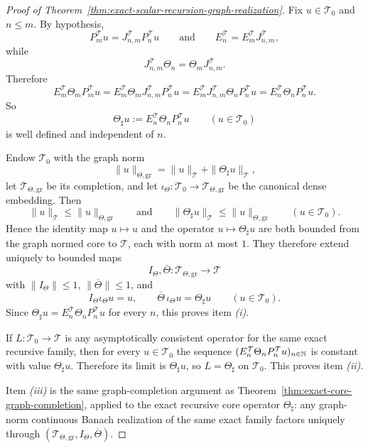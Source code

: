 \begin{proof}[Proof of Theorem~\ref{thm:exact-scalar-recursion-graph-realization}]
\label{proof:thm:exact-scalar-recursion-graph-realization}
Fix \(u\in\mathcal T_0\) and \(n\le m\). By hypothesis,
\[
P_m^{\mathcal T}u=J_{n,m}^{\mathcal T}P_n^{\mathcal T}u
\qquad\text{and}\qquad
E_n^{\mathcal T}=E_m^{\mathcal T}J_{n,m}^{\mathcal T},
\]
while
\[
J_{n,m}^{\mathcal T}\Theta_n=\Theta_mJ_{n,m}^{\mathcal T}.
\]
Therefore
\[
E_m^{\mathcal T}\Theta_mP_m^{\mathcal T}u
=
E_m^{\mathcal T}\Theta_mJ_{n,m}^{\mathcal T}P_n^{\mathcal T}u
=
E_m^{\mathcal T}J_{n,m}^{\mathcal T}\Theta_nP_n^{\mathcal T}u
=
E_n^{\mathcal T}\Theta_nP_n^{\mathcal T}u.
\]
So
\[
\Theta_\sharp u:=E_n^{\mathcal T}\Theta_nP_n^{\mathcal T}u
\qquad (u\in\mathcal T_0)
\]
is well defined and independent of \(n\).

Endow \(\mathcal T_0\) with the graph norm
\[
\|u\|_{\Theta,\mathrm{gr}}
=
\|u\|_{\mathcal T}+\|\Theta_\sharp u\|_{\mathcal T},
\]
let \(\mathcal T_{\Theta,\mathrm{gr}}\) be its completion, and let
\(\iota_\Theta:\mathcal T_0\to\mathcal T_{\Theta,\mathrm{gr}}\) be the
canonical dense embedding. Then
\[
\|u\|_{\mathcal T}\le \|u\|_{\Theta,\mathrm{gr}}
\qquad\text{and}\qquad
\|\Theta_\sharp u\|_{\mathcal T}\le \|u\|_{\Theta,\mathrm{gr}}
\qquad (u\in\mathcal T_0).
\]
Hence the identity map \(u\mapsto u\) and the operator
\(u\mapsto \Theta_\sharp u\) are both bounded from the graph normed core to
\(\mathcal T\), each with norm at most \(1\). They therefore extend uniquely
to bounded maps
\[
I_\Theta,\overline\Theta:\mathcal T_{\Theta,\mathrm{gr}}\to\mathcal T
\]
with \(\|I_\Theta\|\le 1\), \(\|\overline\Theta\|\le 1\), and
\[
I_\Theta\iota_\Theta u=u,
\qquad
\overline\Theta\,\iota_\Theta u=\Theta_\sharp u
\qquad (u\in\mathcal T_0).
\]
Since \(\Theta_\sharp u=E_n^{\mathcal T}\Theta_nP_n^{\mathcal T}u\) for every
\(n\), this proves item \emph{(i)}.

If \(L:\mathcal T_0\to\mathcal T\) is any asymptotically consistent operator
for the same exact recursive family, then for every \(u\in\mathcal T_0\) the
sequence \((E_n^{\mathcal T}\Theta_nP_n^{\mathcal T}u)_{n\in\mathbb{N}}\) is
constant with value \(\Theta_\sharp u\). Therefore its limit is
\(\Theta_\sharp u\), so \(L=\Theta_\sharp\) on \(\mathcal T_0\). This proves
item \emph{(ii)}.

Item \emph{(iii)} is the same graph-completion argument as
Theorem~\ref{thm:exact-core-graph-completion}, applied to the exact recursive
core operator \(\Theta_\sharp\): any graph-norm continuous Banach realization
of the same exact family factors uniquely through
\((\mathcal T_{\Theta,\mathrm{gr}},I_\Theta,\overline\Theta)\).
\end{proof}

